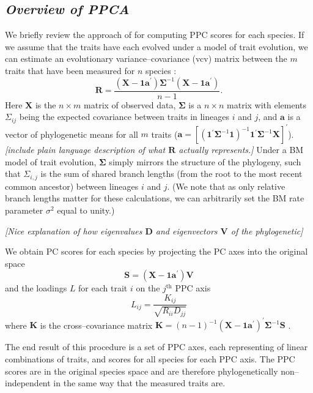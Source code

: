 \documentclass[a4paper,12pt]{article}
\begin{document}
\subsection{\emph{Overview of PPCA}}
We briefly review the approach of \citet{Revell2008} for computing PPC scores for each species. If we assume that the traits have each evolved under a model of trait evolution, we can estimate an evolutionary variance--covariance (vcv) matrix between the $m$ traits that have been measured for $n$ species \citep{RevellHarmon2008, RevellCollar2009}:
\begin{equation}\label{eq:r}
\mathbf{R} = \frac{(\mathbf{X} - \mathbf{1a}^\prime ) \mathbf{\Sigma}^{-1} 
(\mathbf{X} - \mathbf{1a}^\prime )}{n-1}.
\end{equation}
Here $\mathbf{X}$ is the $n \times m$ matrix of observed data, $\mathbf{\Sigma}$ is a $n \times n$ matrix with elements $\Sigma_{ij}$ being the expected covariance between traits in lineages $i$ and $j$, and $\mathbf{a}$ is a vector of phylogenetic means for all $m$ traits ($\mathbf{a}=[(\mathbf{1}^\prime \mathbf{\Sigma}^{-1} \mathbf{1})^{-1} 
\mathbf{1}^\prime \mathbf{\Sigma}^{-1} \mathbf{X}]^\prime$). \emph{[include plain language description of what $\mathbf{R}$ actually represents.]}
Under a BM model of trait evolution, $\mathbf{\Sigma}$ simply mirrors the structure of the phylogeny, such that $\Sigma_{i,j}$ is the sum of shared branch lengths (from the root to the most recent common ancestor) between lineages $i$ and $j$. (We note that as only relative branch lengths matter for these calculations, we can arbitrarily set the BM rate parameter $\sigma^2$ equal to unity.) 

\emph{[Nice explanation of how eigenvalues $\mathbf{D}$ and eigenvectors $\mathbf{V}$ of the phylogenetic]}

We obtain PC scores for each species by projecting the PC axes into the original space
\begin{equation}
\mathbf{S} = (\mathbf{X} - \mathbf{1a}^\prime )\mathbf{V}
\end{equation}
and the loadings $L$ for each trait $i$ on the $j^{\mathrm{th}}$ PPC axis
\begin{equation}
L_{ij} = \frac{K_{ij}}{\sqrt{R_{ii}D_{jj}}}
\end{equation}
where $\mathbf{K}$ is the cross--covariance matrix $\mathbf{K}=(n-1)^{-1}(\mathbf{X}-\mathbf{1a}^\prime)^\prime \mathbf{\Sigma}^{-1} \mathbf{S}$ \citep[see][for details and explanation]{Revell2008}.

The end result of this procedure is a set of PPC axes, each representing of linear combinations of traits, and scores for all species for each PPC axis. The PPC scores are in the original species space and are therefore phylogenetically non--independent in the same way that the measured traits are.  
\end{document}
